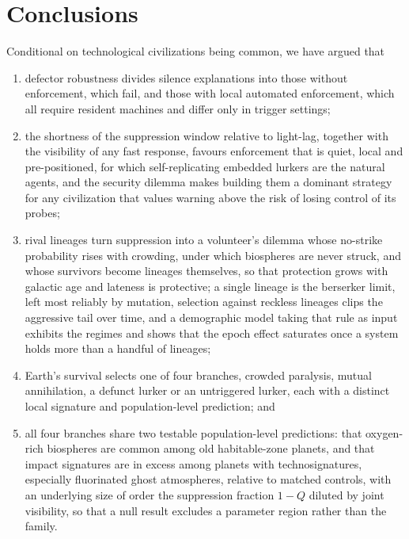\documentclass[preprint,12pt]{elsarticle}
\theoremstyle{definition}
\begin{document}
\section{Conclusions}
\label{sec:conclusions}

Conditional on technological civilizations being common, we have argued that
\begin{enumerate}
  \item defector robustness divides silence explanations into those without enforcement, which fail, and those with local automated enforcement, which all require resident machines and differ only in trigger settings;
  \item the shortness of the suppression window relative to light-lag, together with the visibility of any fast response, favours enforcement that is quiet, local and pre-positioned, for which self-replicating embedded lurkers are the natural agents, and the security dilemma makes building them a dominant strategy for any civilization that values warning above the risk of losing control of its probes;
  \item rival lineages turn suppression into a volunteer's dilemma whose no-strike probability rises with crowding, under which biospheres are never struck, and whose survivors become lineages themselves, so that protection grows with galactic age and lateness is protective; a single lineage is the berserker limit, left most reliably by mutation, selection against reckless lineages clips the aggressive tail over time, and a demographic model taking that rule as input exhibits the regimes and shows that the epoch effect saturates once a system holds more than a handful of lineages;
  \item Earth's survival selects one of four branches, crowded paralysis, mutual annihilation, a defunct lurker or an untriggered lurker, each with a distinct local signature and population-level prediction; and
  \item all four branches share two testable population-level predictions: that oxygen-rich biospheres are common among old habitable-zone planets, and that impact signatures are in excess among planets with technosignatures, especially fluorinated ghost atmospheres, relative to matched controls, with an underlying size of order the suppression fraction $1 - Q$ diluted by joint visibility, so that a null result excludes a parameter region rather than the family.
\end{enumerate}
\end{document}
